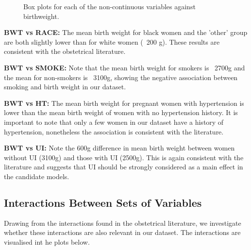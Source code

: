 \begin{figure}[!htb]
\begin{subfigure}[b]{0.3\textwidth}
            \label{fig:BWTvsUI}
        \end{subfigure}
        \caption[ The average and standard deviation of critical parameters ]
        {\small Box plots for each of the non-continuous variables against birthweight.} 
        \label{fig:Non-continuous correlation}
    \end{figure}

\textbf{BWT vs RACE:} The mean birth weight for black women and the 'other' group are both slightly lower than for white women (~200 g). These results are consistent with the obstetrical literature.

\textbf{BWT vs SMOKE:} Note that the mean birth weight for smokers is ~2700g and the mean for non-smokers is ~3100g, showing the negative association between smoking and birth weight in our dataset.

\textbf{BWT vs HT:} The mean birth weight for pregnant women with hypertension is lower than the mean birth weight of women with no hypertension history. It is important to note that only a few women in our dataset have a history of hypertension, nonetheless the association is consistent with the literature.

\textbf{BWT vs UI:} Note the 600g difference in mean birth weight between women without UI (3100g) and those with UI (2500g). This is again consistent with the literature and suggests that UI should be strongly considered as a main effect in the candidate models.

\subsection{Interactions Between Sets of Variables}
Drawing from the interactions found in the obstetrical literature, we investigate whether these interactions are also relevant in our dataset. The interactions are visualised int he plots below.

